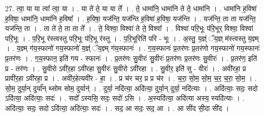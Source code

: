 \documentclass[17pt]{extarticle}
\begin{document}
27. त्वा॒ या या त्वा᳚ त्वा॒ या । . या ते॑ ते॒ या या ते᳚ । . ते॒ धामा॑नि॒ धामा॑नि ते ते॒ धामा॑नि । . धामा॑नि ह॒विषा॑ ह॒विषा॒ धामा॑नि॒ धामा॑नि ह॒विषा᳚ । . ह॒विषा॒ यज॑न्ति॒ यज॑न्ति ह॒विषा॑ ह॒विषा॒ यज॑न्ति । . यज॑न्ति॒ ता ता यज॑न्ति॒ यज॑न्ति॒ ता । . ता ते॑ ते॒ ता ता ते᳚ । . ते॒ विश्वा॒ विश्वा॑ ते ते॒ विश्वा᳚ । . विश्वा॑ परि॒भूः प॑रि॒भूर् विश्वा॒ विश्वा॑ परि॒भूः । . प॒रि॒भू र॑स्त्वस्तु परि॒भूः प॑रि॒भू र॑स्तु । . प॒रि॒भूरिति॑ परि - भूः । . अ॒स्तु॒ य॒ज्ञ्ं ॅय॒ज्ञ् म॑स्त्वस्तु य॒ज्ञ्म् । . य॒ज्ञ्म् ग॑य॒स्फानो॑ गय॒स्फानो॑ य॒ज्ञ्ं ॅय॒ज्ञ्म् ग॑य॒स्फानः॑ । . ग॒य॒स्फानः॑ प्र॒तर॑णः प्र॒तर॑णो गय॒स्फानो॑ गय॒स्फानः॑ प्र॒तर॑णः । . ग॒य॒स्फान॒ इति॑ गय - स्फानः॑ । . प्र॒तर॑णः सु॒वीरः॑ सु॒वीरः॑ प्र॒तर॑णः प्र॒तर॑णः सु॒वीरः॑ । . प्र॒तर॑ण॒ इति॑ प्र - तर॑णः । . सु॒वीरो ऽवी॑र॒हा ऽवी॑रहा सु॒वीरः॑ सु॒वीरो ऽवी॑रहा । . सु॒वीर॒ इति॑ सु - वीरः॑ । . अवी॑रहा॒ प्र प्रावी॑र॒हा ऽवी॑रहा॒ प्र । . अवी॑र॒हेत्यवी॑र - हा॒ । . प्र च॑र चर॒ प्र प्र च॑र । . च॒रा॒ सो॒म॒ सो॒म॒ च॒र॒ च॒रा॒ सो॒म॒ । . सो॒म॒ दुर्या॒न् दुर्या᳚न् थ्सोम सोम॒ दुर्यान्॑ । . दुर्या॒ नदि॑त्या॒ अदि॑त्या॒ दुर्या॒न् दुर्या॒ नदि॑त्याः । . अदि॑त्याः॒ सदः॒ सदो ऽदि॑त्या॒ अदि॑त्याः॒ सदः॑ । . सदो᳚ ऽस्यसि॒ सदः॒ सदो॑ ऽसि । . अ॒स्यदि॑त्या॒ अदि॑त्या अस्य॒ स्यदि॑त्याः । . अदि॑त्याः॒ सदः॒ सदो ऽदि॑त्या॒ अदि॑त्याः॒ सदः॑ । . सद॒ आ सदः॒ सद॒ आ । . आ सी॑द सी॒दा सी॑द । \newline
\end{document}
